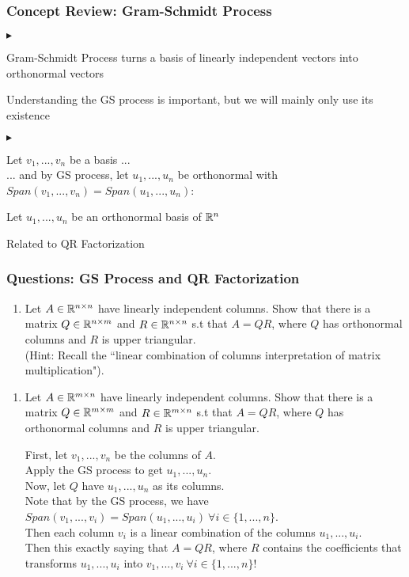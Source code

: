 \documentclass[table]{beamer}
\renewenvironment{itemize}
\renewenvironment{enumerate}%
{\begin{list}{\arabic{enumi}.}%
      {\setlength{\leftmargin}{2.5em}%
       \setlength{\itemsep}{-\parsep}%
       \setlength{\topsep}{-\parskip}%
       \usecounter{enumi}}%
 }{\end{list}}
\renewenvironment{itemize}%
{\begin{list}{$\blacktriangleright$}%
      {\setlength{\leftmargin}{2.5em}%
       \setlength{\itemsep}{-\parsep}%
       \setlength{\topsep}{-\parskip}%
       \usecounter{enumi}}%
 }{\end{list}}
\begin{document}
\begin{frame}
\frametitle{Concept Review: Gram-Schmidt Process}
\begin{itemize}
\item Gram-Schmidt Process turns a basis of linearly independent vectors into orthonormal vectors
\item Understanding the GS process is important, but we will mainly only use its existence
\begin{itemize}
\item Let $v_1,...,v_n$ be a basis ... \\
... and by GS process, let $u_1,...,u_n$ be orthonormal with $Span(v_1,...,v_n)=Span(u_1,...,u_n)$:
\item Let $u_1,...,u_n$ be an orthonormal basis of $\mathbb{R}^n$
\end{itemize}

\item Related to QR Factorization
\end{itemize}
\end{frame}


\begin{frame}
\frametitle{Questions: GS Process and QR Factorization}
\begin{enumerate}
\item Let $A\in \mathbb{R}^{n\times n}$ have linearly independent columns. Show that there is a matrix $Q\in \mathbb{R}^{n \times m}$ and $R \in \mathbb{R}^{n\times n} $ s.t that $A=QR$, where $Q$ has orthonormal columns and $R$ is upper triangular. \\
\medskip
(Hint: Recall the ``linear combination of columns interpretation of matrix multiplication").
\end{enumerate}
\end{frame}

\begin{frame}

\begin{enumerate}
\item Let $A\in \mathbb{R}^{m\times n}$ have linearly independent columns. Show that there is a matrix $Q\in \mathbb{R}^{m\times m}$ and $R \in \mathbb{R}^{m\times n} $ s.t that $A=QR$, where $Q$ has orthonormal columns and $R$ is upper triangular. \\
\begin{solution}
First, let $v_1,...,v_n$ be the columns of $A$.\\
 Apply the GS process to get $u_1,...,u_n$. \\
 Now, let $Q$ have $u_1,...,u_n$ as its columns. \\
 Note that by the GS process, we have $Span(v_1,..., v_i) = Span(u_1,...,u_i)\ \forall i\in \{1,...,n\}$.\\
  Then each column $v_i$ is a linear combination of the columns $u_1,...,u_i$. \\
  Then this exactly saying that $A=QR$, where $R$ contains the coefficients that transforms $u_1,...,u_i$ into $v_1,...,v_i\ \forall i \in \{1,...,n\}$!
\end{solution}
\end{enumerate}
\end{frame}
\end{document}
